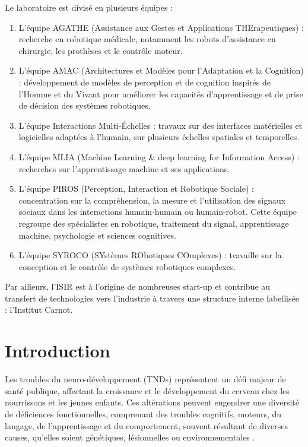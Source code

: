 \documentclass[5pt]{article}
\begin{document}
Le laboratoire est divisé en plusieurs équipes :

\begin{enumerate}
    \item L'équipe AGATHE (Assistance aux Gestes et Applications THErapeutiques) : recherche en robotique médicale, notamment les robots d'assistance en chirurgie, les prothèses et le contrôle moteur.
    \item L'équipe AMAC (Architectures et Modèles pour l'Adaptation et la Cognition) : développement de modèles de perception et de cognition inspirés de l'Homme et du Vivant pour améliorer les capacités d'apprentissage et de prise de décision des systèmes robotiques.
    \item L'équipe Interactions Multi-Échelles : travaux sur des interfaces matérielles et logicielles adaptées à l'humain, sur plusieurs échelles spatiales et temporelles.
    \item L'équipe MLIA (Machine Learning \& deep learning for Information Access) : recherches sur l'apprentissage machine et ses applications.
    \item L'équipe PIROS (Perception, Interaction et Robotique Sociale) : concentration sur la compréhension, la mesure et l'utilisation des signaux sociaux dans les interactions humain-humain ou humain-robot. Cette équipe regroupe des spécialistes en robotique, traitement du signal, apprentissage machine, psychologie et sciences cognitives.
    \item L'équipe SYROCO (SYstèmes RObotiques COmplexes) : travaille sur la conception et le contrôle de systèmes robotiques complexes.
\end{enumerate}

Par ailleurs, l'ISIR est à l'origine de nombreuses start-up et contribue au transfert de technologies vers l'industrie à travers une structure interne labellisée : l'Institut Carnot.

\newpage
\pagestyle{fancy}
\setcounter{page}{1}
\section{Introduction}
Les troubles du neuro-développement (TNDs) représentent un défi majeur de santé publique, affectant la croissance et le développement du cerveau chez les nourrissons et les jeunes enfants. Ces altérations peuvent engendrer une diversité de déficiences fonctionnelles, comprenant des troubles cognitifs, moteurs, du langage, de l'apprentissage et du comportement, souvent résultant de diverses causes, qu'elles soient génétiques, lésionnelles ou environnementales \cite{development_americas_nodate}.
\end{document}
